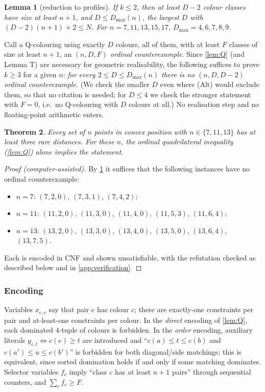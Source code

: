 \documentclass[11pt]{amsart}
\newtheorem{theorem}{Theorem}[section]
\newtheorem{lemma}[theorem]{Lemma}
\theoremstyle{definition}
\theoremstyle{remark}
\begin{document}
\begin{lemma}[reduction to profiles]\label{lem:R}
If $k\le2$, then at least $D-2$ colour classes have size at least $n+1$, and $D\le D_{\max}(n)$, the largest $D$ with $(D-2)(n+1)+2\le N$. For $n=7,11,13,15,17$, $D_{\max}=4,6,7,8,9$.
\end{lemma}

Call a Q-colouring using exactly $D$ colours, all of them, with at least $F$ classes of size at least $n+1$, an \emph{$(n,D,F)$ ordinal counterexample}. Since \cref{lem:Q} (and Lemma T) are necessary for geometric realisability, the following suffices to prove $k\ge3$ for a given $n$: \emph{for every $2\le D\le D_{\max}(n)$ there is no $(n,D,D-2)$ ordinal counterexample.} (We check the smaller $D$ even where (Alt) would exclude them, so that no citation is needed; for $D\le4$ we check the stronger statement with $F=0$, i.e.\ no Q-colouring with $D$ colours at all.) No realisation step and no floating-point arithmetic enters.

\begin{theorem}\label{thm:1113}
Every set of $n$ points in convex position with $n\in\{7,11,13\}$ has at least three rare distances. For these $n$, the ordinal quadrilateral inequality (\cref{lem:Q}) alone implies the statement.
\end{theorem}
\begin{proof}[Proof (computer-assisted)]
By \cref{lem:R} it suffices that the following instances have no ordinal counterexample:
\begin{itemize}[leftmargin=2em]
\item $n=7$: $(7,2,0)$, $(7,3,1)$, $(7,4,2)$;
\item $n=11$: $(11,2,0)$, $(11,3,0)$, $(11,4,0)$, $(11,5,3)$, $(11,6,4)$;
\item $n=13$: $(13,2,0)$, $(13,3,0)$, $(13,4,0)$, $(13,5,0)$, $(13,6,4)$, $(13,7,5)$.
\end{itemize}
Each is encoded in CNF and shown unsatisfiable, with the refutation checked as described below and in \cref{app:verification}.
\end{proof}

\subsubsection*{Encoding}
Variables $x_{e,c}$ say that pair $e$ has colour $c$; there are exactly-one constraints per pair and at-least-one constraints per colour. In the \emph{direct} encoding of \cref{lem:Q}, each dominated $4$-tuple of colours is forbidden. In the \emph{order} encoding, auxiliary literals $y_{e,t}\Leftrightarrow c(e)\ge t$ are introduced and ``$c(a)\le t\le c(b)$ and $c(a')\le u\le c(b')$'' is forbidden for both diagonal/side matchings; this is equivalent, since sorted domination holds if and only if some matching dominates. Selector variables $f_c$ imply ``class $c$ has at least $n+1$ pairs'' through sequential counters, and $\sum_cf_c\ge F$.
\end{document}
